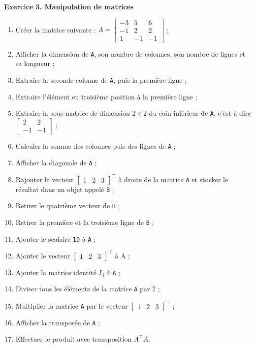 \documentclass[
  11pt,
]{book}
\makeatletter
\providecommand{\tightlist}{%
  \setlength{\itemsep}{0pt}\setlength{\parskip}{0pt}}
\numberwithin{equation}{section}
\numberwithin{countremarque}{section}
\newenvironment{exframe}{%
 \def\at@end@of@exframe{}%
 \ifinner\ifhmode%
  \def\at@end@of@exframe{\end{minipage}}%
  \begin{minipage}{\columnwidth}%
 \fi\fi%
 \def\FrameCommand##1{\hskip\@totalleftmargin \hskip-\fboxsep
 \colorbox{shadecolorex}{##1}\hskip-\fboxsep
     \hskip-\linewidth \hskip-\@totalleftmargin \hskip\columnwidth}%
 \MakeFramed {\advance\hsize-\width
   \@totalleftmargin\z@ \linewidth\hsize
   \@setminipage}}%
 {\par\unskip\endMakeFramed%
 \at@end@of@exframe}
\makeatother
\begin{document}
\begin{exframe}
\textbf{Exercice 3. Manipulation de matrices}

\begin{enumerate}
\def\labelenumi{\arabic{enumi}.}
\tightlist
\item
  Créer la matrice suivante : \(A = \begin{bmatrix} -3 & 5 & 6 \\ -1 & 2 & 2 \\ 1 & -1 & -1 \end{bmatrix}\) ;
\item
  Afficher la dimension de \texttt{A}, son nombre de colonnes, son nombre de lignes et sa longueur ;
\item
  Extraire la seconde colonne de \texttt{A}, puis la première ligne ;
\item
  Extraire l'élément en troisième position à la première ligne ;
\item
  Extraire la sous-matrice de dimension \(2\times 2\) du coin inférieur de \texttt{A}, c'est-à-dire \(\begin{bmatrix} 2 & 2 \\ -1 & -1 \end{bmatrix}\) ;
\item
  Calculer la somme des colonnes puis des lignes de \texttt{A} ;
\item
  Afficher la diagonale de \texttt{A} ;
\item
  Rajouter le vecteur \(\begin{bmatrix} 1 & 2 & 3\end{bmatrix}^\top\) à droite de la matrice \texttt{A} et stocker le résultat dans un objet appelé \texttt{B} ;
\item
  Retirer le quatrième vecteur de \texttt{B} ;
\item
  Retirer la première et la troisième ligne de \texttt{B} ;
\item
  Ajouter le scalaire \texttt{10} à \texttt{A} ;
\item
  Ajouter le vecteur \(\begin{bmatrix} 1 & 2 & 3\end{bmatrix}^\top\) à A ;
\item
  Ajouter la matrice identité \(I_3\) à \texttt{A} ;
\item
  Diviser tous les éléments de la matrice \texttt{A} par 2 ;
\item
  Multiplier la matrice \texttt{A} par le vecteur \(\begin{bmatrix} 1 & 2 & 3\end{bmatrix}^\top\) ;
\item
  Afficher la transposée de \texttt{A} ;
\item
  Effectuer le produit avec transposition \(A^\top A\).
\end{enumerate}
\end{exframe}
\end{document}
